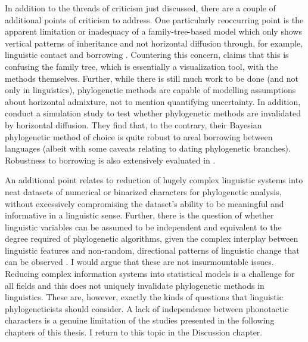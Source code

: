 In addition to the threads of criticism just discussed, there are a couple of additional points of criticism to address. One particularly reoccurring point is the apparent limitation or inadequacy of a family-tree-based model which only shows vertical patterns of inheritance and not horizontal diffusion through, for example, linguistic contact and borrowing \autocites{bateman_speaking_1990}{donohue_new_2012}{gould_urchin_1987}. Countering this concern, \textcite{bowern_historical_2010} claims that this is confusing the family tree, which is essentially a visualization tool, with the methods themselves. Further, while there is still much work to be done (and not only in linguistics), phylogenetic methods are capable of modelling assumptions about horizontal admixture, not to mention quantifying uncertainty. In addition, \textcite{greenhill_does_2009} conduct a simulation study to test whether phylogenetic methods are invalidated by horizontal diffusion. They find that, to the contrary, their Bayesian phylogenetic method of choice is quite robust to areal borrowing between languages (albeit with some caveats relating to dating phylogenetic branches). Robustness to borrowing is also extensively evaluated in \textcite{bouckaert_origin_2018}.

An additional point relates to reduction of hugely complex linguistic systems into neat datasets of numerical or binarized characters for phylogenetic analysis, without excessively compromising the dataset's ability to be meaningful and informative in a linguistic sense. Further, there is the question of whether linguistic variables can be assumed to be independent and equivalent to the degree required of phylogenetic algorithms, given the complex interplay between linguistic features and non-random, directional patterns of linguistic change that can be observed \autocite{heggarty_interdisciplinary_2006}. I would argue that these are not insurmountable issues. Reducing complex information systems into statistical models is a challenge for all fields and this does not uniquely invalidate phylogenetic methods in linguistics. These are, however, exactly the kinds of questions that linguistic phylogeneticists should consider. A lack of independence between phonotactic characters is a genuine limitation of the studies presented in the following chapters of this thesis. I return to this topic in the Discussion chapter.

